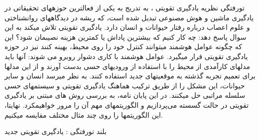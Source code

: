 


\pagestyle{empty}

‌تورفتگی
نظریه یادگیری تقویتی 
،
به تدریج به یکی از فعال\nf ترین حوزه\nf های تحقیقاتی در یادگیری ماشین و هوش مصنوعی تبدیل شده است، که ریشه در دیدگاه\nf های روانشناختی و علوم اعصاب درباره رفتار حیوانات و انسان دارد. یادگیری تقویتی تلاش می\nf کند به این سوال پاسخ دهد: چه کار کنیم که بیش\nf ترین پاداش یا کم\nf ترین هزینه نصیبمان شود؟ این که چگونه عوامل هوشمند می\nf توانند کنترل خود را روی محیط، بهینه کنند نیز در حوزه یادگیری تقویتی قرار می\nf گیرد. عوامل هوشمند با کاری دشوار روبرو می شوند: آنها باید مدل\nf های کارآمدی از محیط را با استفاده از ورودی\nf های حسی بدست آورند و از این مدل\nf ها برای تعمیم تجربه گذشته به موقعیت\nf های جدید استفاده کنند. به نظر می\nf رسد انسان و سایر حیوانات، این مشکل را از طریق ترکیب هماهنگ یادگیری تقویتی و سیستم\nf های حسی سلسله مراتبی حل می\nf کنند. در این پایان نامه، به بررسی روش های مبتنی بر یادگیری تقویتی در حالت گسسته می‌پردازیم و الگوریتم\nf های مهم آن را مرور خواهیم\nf کرد. نهایتا، این الگوریتم\nf ها را روی چند مثال مختلف مقایسه می\nf کنیم.

‌بلند
‌تورفتگی : 
یادگیری تقویتی
‌جدید
